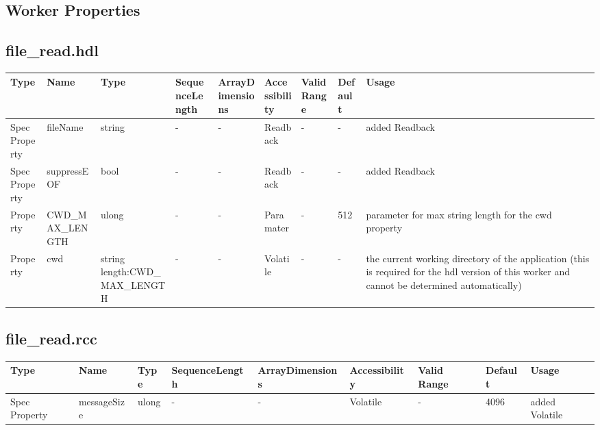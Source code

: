 \documentclass{article}
\def\comp{file\_read}
\begin{document}
\begin{landscape}
	\section*{Worker Properties}
	\subsection*{\comp.hdl}
	\begin{scriptsize}
\begin{tabular}{|p{2cm}|p{2.75cm}|p{3.5cm}|p{2cm}|p{2cm}|p{2.25cm}|p{1.5cm}|p{1cm}|p{4cm}|}
			\hline
			\rowcolor{blue}
			Type     & Name                      & Type  & SequenceLength & ArrayDimensions & Accessibility       & Valid Range & Default & Usage                                      \\
			\hline
			Spec Property & fileName & string  & - & - & Readback & -  &- & added Readback
            \\
            \hline
            Spec Property & suppressEOF & bool  & - & - & Readback & -  &- & added Readback
            \\
            \hline
            Property & CWD\_MAX\_LENGTH & ulong  & - & - & Paramater & -  & 512 & parameter for max string length for the cwd property
            \\
            \hline
            Property & cwd & string length:CWD\_MAX\_LENGTH & - & - & Volatile & -  &- & the current working directory of the application (this is required for the hdl version of this worker and cannot be determined automatically)
            \\
            \hline
    \end{tabular}
	\end{scriptsize}

	\subsection*{\comp.rcc}
    \begin{scriptsize}
    \begin{tabular}{|p{2cm}|p{2.75cm}|p{1cm}|p{2.75cm}|p{2cm}|p{2.25cm}|p{2cm}|p{1cm}|p{5cm}|}
			\hline
			\rowcolor{blue}
			Type     & Name                      & Type  & SequenceLength & ArrayDimensions & Accessibility       & Valid Range & Default & Usage                                      \\
			\hline
            Spec Property & messageSize & ulong  & - & - &  Volatile & -  &4096 & added Volatile
            \\
            \hline
    \end{tabular}
	\end{scriptsize}


\end{landscape}
\end{document}
